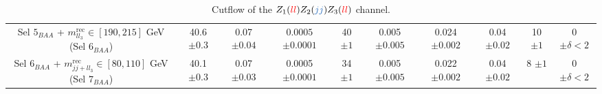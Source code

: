 \documentclass[a4paper,11pt]{article}
\begin{document}
\begin{table}[h!]
\begin{adjustbox}{width=1\textwidth}
\begin{tabular}{|c|c|c|c|c|c|c|c|c|c|}
            \thead{Sel $5_{BAA}$ + $m^{\mbox{rec}}_{ll_3}\in[190,215]$ GeV \\ (Sel $6_{BAA}$)} & \thead{40.6\\$\pm0.3$} & \thead{0.07\\$\pm0.04$} & \thead{$0.0005$\\$\pm0.0001$} & \thead{40\\$\pm1$} & \thead{0.005\\$\pm0.005$} & \thead{0.024\\$\pm0.002$} & \thead{0.04\\$\pm0.02$} & \thead{10\\$\pm1$} & \thead{0\\$\pm\delta<2$} \\
            \thead{Sel $6_{BAA}$ + $m^{\mbox{rec}}_{jj+ll_3}\in[80,110]$ GeV \\ (Sel $7_{BAA}$)} & \thead{40.1\\$\pm0.3$} & \thead{0.07\\$\pm0.03$} & \thead{0.0005\\$\pm0.0001$} & \thead{34\\$\pm1$} & \thead{0.005\\$\pm0.005$} & \thead{0.022\\$\pm0.002$} & \thead{0.04\\$\pm0.02$} & \thead{8\\$\pm1$} & \thead{0\\$\pm\delta<2$} \\
            \hline
        \end{tabular}
        \end{adjustbox}
        \caption{Cutflow of the $Z_1(\textcolor{red}{ll})Z_2(\textcolor{NavyBlue}{jj})Z_3(\textcolor{red}{ll})$ channel.}
        \label{Cutflowlljjll}
    \end{table}
\end{document}
